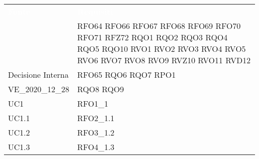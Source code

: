 \renewcommand{\arraystretch}{1.5}
\begin{longtable}{|C{6cm} C{6cm}|} 
	
	\textcolor{white}{\textbf{Fonte}}&
	\textcolor{white}{\textbf{Requisiti}}\\	

	 & RFO64 \newline RFO66 \newline RFO67 \newline RFO68 \newline RFO69 \newline RFO70 \newline RFO71 \newline RFZ72 \newline RQO1 \newline RQO2 \newline RQO3 \newline RQO4 \newline RQO5 \newline RQO10 \newline RVO1 \newline RVO2 \newline RVO3 \newline RVO4 \newline RVO5 \newline RVO6 \newline RVO7 \newline RVO8 \newline RVO9 \newline RVZ10 \newline RVO11 \newline RVD12 \\
	
	Decisione Interna & RFO65 \newline RQO6 \newline RQO7 \newline RPO1  \\
	
	VE\_2020\_12\_28 & RQO8 \newline RQO9  \\

	UC1 & RFO1\_1 \\

	UC1.1 & RFO2\_1.1 \\
	
	UC1.2 & RFO3\_1.2 \\
	
	UC1.3 & RFO4\_1.3 \\
	

\end{longtable}

